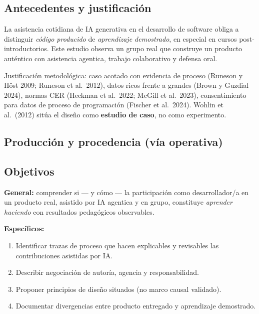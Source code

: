 \documentclass[11pt,a4paper]{scrartcl}
\begin{document}
\subsection*{Antecedentes y justificación}
La asistencia cotidiana de IA generativa en el desarrollo de software obliga a
distinguir \emph{código producido} de \emph{aprendizaje demostrado}, en especial
en cursos post-introductorios. Este estudio observa un grupo real que construye
un producto auténtico con asistencia agentica, trabajo colaborativo y defensa oral.

Justificación metodológica: caso acotado con evidencia de proceso (Runeson y Höst
2009; Runeson et al.\ 2012), datos ricos frente a grandes (Brown y Guzdial 2024),
normas CER (Heckman et al.\ 2022; McGill et al.\ 2023), consentimiento para datos
de proceso de programación (Fischer et al.\ 2024). Wohlin et al.\ (2012) sitúa el
diseño como \textbf{estudio de caso}, no como experimento.

\vspace{0.35em}
\subsection*{Producción y procedencia (vía operativa)}
\ProductionRationale
{}

\subsection*{Objetivos}
\textbf{General:} comprender si --- y cómo --- la participación como desarrollador/a
en un producto real, asistido por IA agentica y en grupo, constituye
\emph{aprender haciendo} con resultados pedagógicos observables.

\textbf{Específicos:}
\begin{enumerate}
  \item Identificar trazas de proceso que hacen explicables y revisables las
        contribuciones asistidas por IA.
  \item Describir negociación de autoría, agencia y responsabilidad.
  \item Proponer principios de diseño situados (no marco causal validado).
  \item Documentar divergencias entre producto entregado y aprendizaje demostrado.
\end{enumerate}
\end{document}
